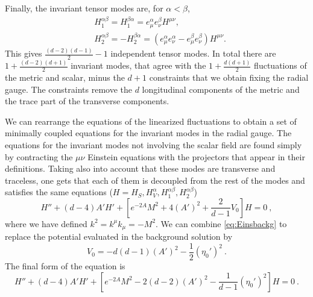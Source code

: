 Finally, the invariant tensor modes are, for $\alpha< \beta$,
\begin{equation}
\begin{split}
&H_1^{\alpha\beta}=H_1^{\beta\alpha}=e^{\alpha}_\mu e^{\beta}_\nu H^{\mu\nu},\\
&H_2^{\alpha\beta}=-H_2^{\beta\alpha}=(e_\mu^{\alpha}e_\nu^{\alpha}-e_\mu^{\beta}e_\nu^{\beta})H^{\mu\nu}.
\end{split}
\end{equation}
This gives $\frac{(d-2)(d-1)}{2}-1$ independent tensor modes. In total there are $1+\frac{(d-2)(d+1)}{2}$
invariant modes, that agree with the $1+\frac{d(d+1)}{2}$ fluctuations of the metric and scalar, minus the $d+1$ constraints that we obtain fixing the radial gauge. The constraints remove the $d$ longitudinal components of the metric and the trace part of the transverse components.

We can rearrange the equations of the linearized fluctuations to obtain a set of minimally coupled equations for the invariant modes in the radial gauge. The equations for the invariant modes not involving the scalar field are found simply by contracting the $\mu\nu$ Einstein equations with the projectors that appear in their definitions. Taking also into account that these modes are transverse and traceless, one gets that each of them is decoupled from the rest of the modes and satisfies the same equations ($H=H_S, H_V^\alpha,H_1^{\alpha\beta},H_2^{\alpha\beta}$)
\begin{equation}
	H''+(d-4)A' H'+\left[e^{-2A}M^2+4(A')^2+\frac{2}{d-1}V_0\right]H=0\ ,
\end{equation}
where we have defined $k^2=k^\mu k_\mu=-M^2$. We can combine \eqref{eq:Einsbackg} to replace the potential evaluated in the background solution by
\begin{equation}
	V_0=-d(d-1)(A')^2-\frac{1}{2}(\eta_0')^2\ .
\end{equation}
The final form of the equation is
\begin{equation}\label{eq:invariantHeq}
	H''+(d-4)A' H'+\left[e^{-2A}M^2-2(d-2)(A')^2-\frac{1}{d-1}(\eta_0')^2\right]H=0\ .
\end{equation}

